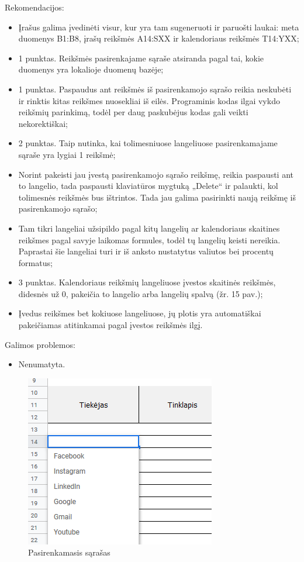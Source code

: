 \bigskip
Rekomendacijos:
\begin{itemize}
    \itemsep0em 
    \item Įrašus galima įvedinėti visur, kur yra tam sugeneruoti ir paruošti laukai: meta duomenys B1:B8, įrašų reikšmės A14:SXX ir kalendoriaus reikšmės T14:YXX;
    \item 1 punktas. Reikšmės pasirenkajame sąraše atsiranda pagal tai, kokie duomenys yra lokalioje duomenų bazėje;
    \item 1 punktas. Paspaudus ant reikšmės iš pasirenkamojo sąrašo reikia neskubėti ir rinktis kitas reikšmes nuosekliai iš eilės. Programinis kodas ilgai vykdo reikšmių parinkimą, todėl per daug paskubėjus kodas gali veikti nekorektiškai;
    \item 2 punktas. Taip nutinka, kai tolimesniuose langeliuose pasirenkamajame sąraše yra lygiai 1 reikšmė; 
    \item Norint pakeisti jau įvestą pasirenkamojo sąrašo reikšmę, reikia paspausti ant to langelio, tada paspausti klaviatūros mygtuką „Delete“ ir palaukti, kol tolimesnės reikšmės bus ištrintos. Tada jau galima pasirinkti naują reikšmę iš pasirenkamojo sąrašo;
    \item Tam tikri langeliai užsipildo pagal kitų langelių ar kalendoriaus skaitines reikšmes pagal savyje laikomas formules, todėl tų langelių keisti nereikia. Paprastai šie langeliai turi ir iš anksto nustatytus valiutos bei procentų formatus;
    \item 3 punktas. Kalendoriaus reikšmių langeliuose įvestos skaitinės reikšmės, didesnės už 0, pakeičia to langelio arba langelių spalvą (žr. 15 pav.);
    \item Įvedus reikšmes bet kokiuose langeliuose, jų plotis yra automatiškai pakeičiamas atitinkamai pagal įvestos reikšmės ilgį.
\end{itemize}

\bigskip
Galimos problemos:
\begin{itemize}
    \itemsep0em 
    \item Nenumatyta.
\end{itemize}

\begin{figure}[H]
    \centering
    \includegraphics[scale=0.7]{Images/Screenshots/records-dropdown-list.PNG}
    \caption{Pasirenkamasis sąrašas}
    \label{img:model}
\end{figure}

